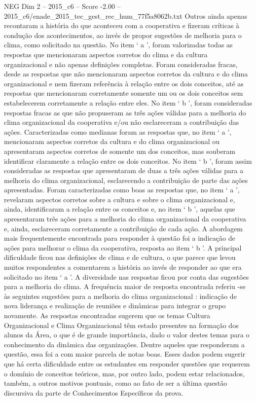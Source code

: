 \begin{textsample}{NEG Dim 2 – 2015\_c6 – Score -2.00 – 2015\_c6/enade\_2015\_tec\_gest\_rec\_hum\_77f5a8062b.txt}
Outros ainda apenas recontaram a história do que aconteceu com a cooperativa e fizeram críticas à condução dos acontecimentos, ao invés de propor sugestões de melhoria para o clima, como solicitado na questão.
No item ‘ a ’, foram valorizadas todas as respostas que mencionaram aspectos corretos do clima e da cultura organizacional e não apenas definições completas.
Foram consideradas fracas, desde as respostas que não mencionaram aspectos corretos da cultura e do clima organizacional e nem fizeram referência à relação entre os dois conceitos, até as respostas que mencionaram corretamente somente um ou os dois conceitos sem estabelecerem corretamente a relação entre eles.
No item ‘ b ’, foram consideradas respostas fracas as que não propuseram as três ações válidas para a melhoria do clima organizacional da cooperativa e/ou não esclareceram a contribuição das ações.
Caracterizadas como medianas foram as respostas que, no item ‘ a ’, mencionaram aspectos corretos da cultura e do clima organizacional ou apresentaram aspectos corretos de somente um dos conceitos, mas souberam identificar claramente a relação entre os dois conceitos.
No item ‘ b ’, foram assim consideradas as respostas que apresentaram de duas a três ações válidas para a melhoria do clima organizacional, esclarecendo a contribuição de parte das ações apresentadas.
Foram caracterizadas como boas as respostas que, no item ‘ a ’, revelaram aspectos corretos sobre a cultura e sobre o clima organizacional e, ainda, identificaram a relação entre os conceitos e, no item ‘ b ’, aquelas que apresentaram três ações para a melhoria do clima organizacional da cooperativa e, ainda, esclareceram corretamente a contribuição de cada ação.
A abordagem mais frequentemente encontrada para responder à questão foi a indicação de ações para melhorar o clima da cooperativa, resposta ao item ‘ b ’.
A principal dificuldade ficou nas definições de clima e de cultura, o que parece que levou muitos respondentes a comentarem a história ao invés de responder ao que era solicitado no item ‘ a ’.
A diversidade nas respostas ficou por conta das sugestões para a melhoria do clima.
A frequência maior de resposta encontrada referiu -se às seguintes sugestões para a melhoria do clima organizacional : indicação de nova liderança e realização de reuniões e dinâmicas para integrar o grupo novamente.
As respostas encontradas sugerem que os temas Cultura Organizacional e Clima Organizacional têm estado presentes na formação dos alunos da Área, o que é de grande importância, dado o valor destes temas para o conhecimento da dinâmica das organizações.
Dentre aqueles que responderam a questão, essa foi a com maior parcela de notas boas.
Esses dados podem sugerir que há certa dificuldade entre os estudantes em responder questões que requerem o domínio de conceitos teóricos, mas, por outro lado, podem estar relacionados, também, a outros motivos pontuais, como ao fato de ser a última questão discursiva da parte de Conhecimentos Específicos da prova.

\end{textsample}

